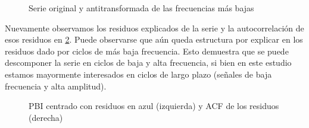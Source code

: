 \documentclass[a4paper]{article}
\begin{document}
\begin{figure}[H]
	\centering
	\caption{Serie original y antitransformada de las frecuencias más bajas} 
	\label{fig:PBI_cntr_antifft}
\end{figure}

Nuevamente observamos los residuos explicados de la serie y la autocorrelación de esos residuos en \ref{fig:PBI_fft_resid}. Puede observarse que aún queda estructura por explicar en los residuos dado por ciclos de más baja frecuencia. Esto demuestra que se puede descomponer la serie en ciclos de baja y alta frecuencia, si bien en este estudio estamos mayormente interesados en ciclos de largo plazo (señales de baja frecuencia y alta amplitud).

\begin{figure}[H]
	\centering
	\caption{PBI centrado con residuos en azul (izquierda) y ACF de los residuos (derecha)}
	\label{fig:PBI_fft_resid}
\end{figure}
\end{document}
